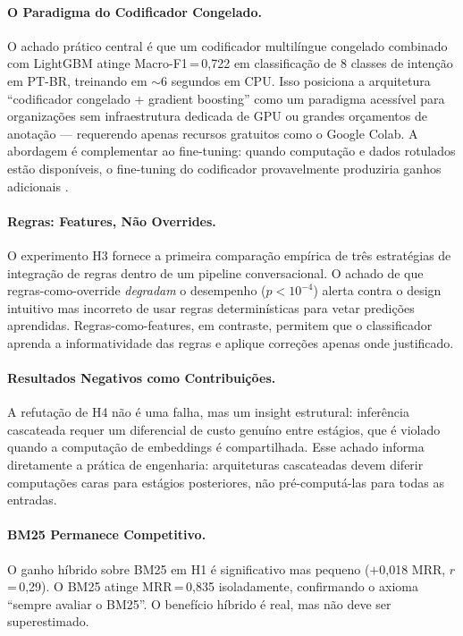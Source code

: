 \documentclass[11pt]{article}
\newcommand{\macrof}{Macro-F1}
\begin{document}
\paragraph{O Paradigma do Codificador Congelado.} O achado prático central é que um codificador multilíngue congelado combinado com LightGBM atinge \macrof{}\,=\,0,722 em classificação de 8 classes de intenção em PT-BR, treinando em $\sim$6 segundos em CPU. Isso posiciona a arquitetura ``codificador congelado + gradient boosting'' como um paradigma acessível para organizações sem infraestrutura dedicada de GPU ou grandes orçamentos de anotação --- requerendo apenas recursos gratuitos como o Google Colab. A abordagem é complementar ao fine-tuning: quando computação e dados rotulados estão disponíveis, o fine-tuning do codificador provavelmente produziria ganhos adicionais \citep{tunstall2022setfit}.

\paragraph{Regras: Features, Não Overrides.} O experimento H3 fornece a primeira comparação empírica de três estratégias de integração de regras dentro de um pipeline conversacional. O achado de que regras-como-override \emph{degradam} o desempenho ($p < 10^{-4}$) alerta contra o design intuitivo mas incorreto de usar regras determinísticas para vetar predições aprendidas. Regras-como-features, em contraste, permitem que o classificador aprenda a informatividade das regras e aplique correções apenas onde justificado.

\paragraph{Resultados Negativos como Contribuições.} A refutação de H4 não é uma falha, mas um insight estrutural: inferência cascateada requer um diferencial de custo genuíno entre estágios, que é violado quando a computação de embeddings é compartilhada. Esse achado informa diretamente a prática de engenharia: arquiteturas cascateadas devem diferir computações caras para estágios posteriores, não pré-computá-las para todas as entradas.

\paragraph{BM25 Permanece Competitivo.} O ganho híbrido sobre BM25 em H1 é significativo mas pequeno ($+$0,018 MRR, $r$\,=\,0,29). O BM25 atinge MRR\,=\,0,835 isoladamente, confirmando o axioma ``sempre avaliar o BM25''. O benefício híbrido é real, mas não deve ser superestimado.
\end{document}
